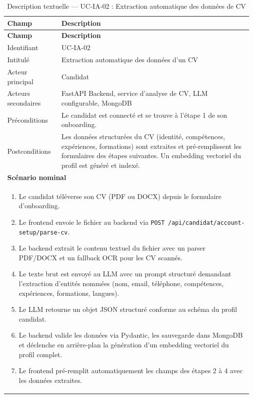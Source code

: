 \renewcommand{\arraystretch}{1.4}
\begin{longtable}{|p{4cm}|p{10cm}|}
\caption{Description textuelle — UC-IA-02 : Extraction automatique des données de CV}
\label{tab:uc_ia02} \\
\hline
\rowcolor[HTML]{EFEFEF} \textbf{Champ} & \textbf{Description} \\ \hline
\endfirsthead
\hline
\rowcolor[HTML]{EFEFEF} \textbf{Champ} & \textbf{Description} \\ \hline
\endhead
\hline
\endfoot
\hline
\endlastfoot
Identifiant & UC-IA-02 \\ \hline
Intitulé & Extraction automatique des données d'un CV \\ \hline
Acteur principal & Candidat \\ \hline
Acteurs secondaires & FastAPI Backend, service d'analyse de CV, LLM configurable, MongoDB \\ \hline
Préconditions & Le candidat est connecté et se trouve à l'étape 1 de son onboarding. \\ \hline
Postconditions & Les données structurées du CV (identité, compétences, expériences, formations) sont extraites et pré-remplissent les formulaires des étapes suivantes. Un embedding vectoriel du profil est généré et indexé. \\ \hline
\multicolumn{2}{|l|}{\textbf{Scénario nominal}} \\ \hline
\multicolumn{2}{|p{14.5cm}|}{
\vspace{2pt}
\begin{enumerate}
    \item Le candidat téléverse son CV (PDF ou DOCX) depuis le formulaire d'onboarding.
    \item Le frontend envoie le fichier au backend via \texttt{POST /api/candidat/account-setup/parse-cv}.
    \item Le backend extrait le contenu textuel du fichier avec un parser PDF/DOCX et un fallback OCR pour les CV scannés.
    \item Le texte brut est envoyé au LLM avec un prompt structuré demandant l'extraction d'entités nommées (nom, email, téléphone, compétences, expériences, formations, langues).
    \item Le LLM retourne un objet JSON structuré conforme au schéma du profil candidat.
    \item Le backend valide les données via Pydantic, les sauvegarde dans MongoDB et déclenche en arrière-plan la génération d'un embedding vectoriel du profil complet.
    \item Le frontend pré-remplit automatiquement les champs des étapes 2 à 4 avec les données extraites.

\end{enumerate}}
\end{longtable}
